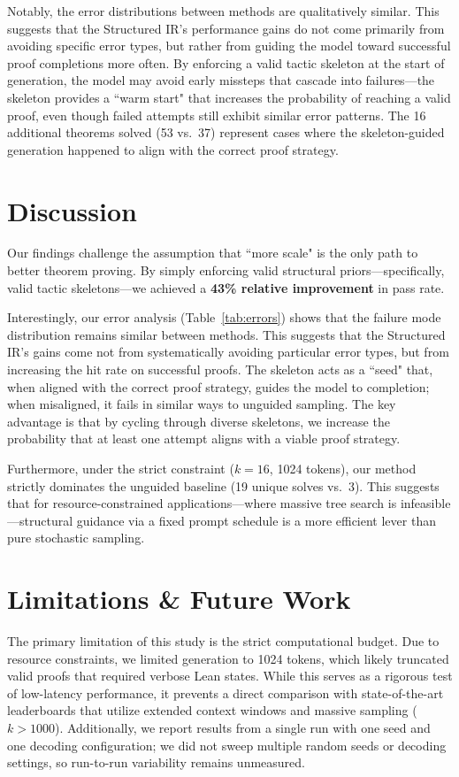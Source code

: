 \documentclass{article}
\begin{document}
Notably, the error distributions between methods are qualitatively similar. This suggests that the Structured IR's performance gains do not come primarily from avoiding specific error types, but rather from guiding the model toward successful proof completions more often. By enforcing a valid tactic skeleton at the start of generation, the model may avoid early missteps that cascade into failures---the skeleton provides a ``warm start" that increases the probability of reaching a valid proof, even though failed attempts still exhibit similar error patterns. The 16 additional theorems solved (53 vs.\ 37) represent cases where the skeleton-guided generation happened to align with the correct proof strategy.


\section{Discussion}
Our findings challenge the assumption that ``more scale" is the only path to better theorem proving. By simply enforcing valid structural priors---specifically, valid tactic skeletons---we achieved a \textbf{43\% relative improvement} in pass rate.

Interestingly, our error analysis (Table~\ref{tab:errors}) shows that the failure mode distribution remains similar between methods. This suggests that the Structured IR's gains come not from systematically avoiding particular error types, but from increasing the hit rate on successful proofs. The skeleton acts as a ``seed" that, when aligned with the correct proof strategy, guides the model to completion; when misaligned, it fails in similar ways to unguided sampling. The key advantage is that by cycling through diverse skeletons, we increase the probability that at least one attempt aligns with a viable proof strategy.

Furthermore, under the strict constraint ($k=16$, 1024 tokens), our method strictly dominates the unguided baseline (19 unique solves vs.\ 3). This suggests that for resource-constrained applications---where massive tree search is infeasible---structural guidance via a fixed prompt schedule is a more efficient lever than pure stochastic sampling.

\section{Limitations \& Future Work}
The primary limitation of this study is the strict computational budget. Due to resource constraints, we limited generation to 1024 tokens, which likely truncated valid proofs that required verbose Lean states. While this serves as a rigorous test of low-latency performance, it prevents a direct comparison with state-of-the-art leaderboards that utilize extended context windows and massive sampling ($k > 1000$). Additionally, we report results from a single run with one seed and one decoding configuration; we did not sweep multiple random seeds or decoding settings, so run-to-run variability remains unmeasured.
\end{document}
